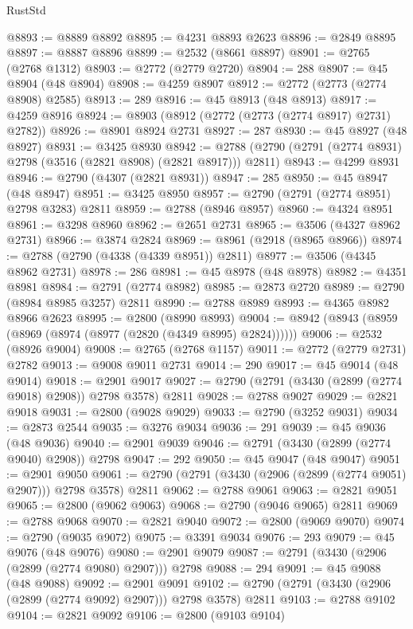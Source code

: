 \begin{lexlean}{RustStd}
\begin{coremodule}
@8893 := @8889 @8892
@8895 := @4231 @8893 @2623
@8896 := @2849 @8895
@8897 := @8887 @8896
@8899 := @2532 (@8661 @8897)
@8901 := @2765 (@2768 @1312)
@8903 := @2772 (@2779 @2720)
@8904 := 288
@8907 := @45 @8904 (@48 @8904)
@8908 := @4259 @8907
@8912 := @2772 (@2773 (@2774 @8908) @2585)
@8913 := 289
@8916 := @45 @8913 (@48 @8913)
@8917 := @4259 @8916
@8924 := @8903 (@8912 (@2772 (@2773 (@2774 @8917) @2731) @2782))
@8926 := @8901 @8924 @2731
@8927 := 287
@8930 := @45 @8927 (@48 @8927)
@8931 := @3425 @8930
@8942 := @2788 (@2790 (@2791 (@2774 @8931) @2798 (@3516 (@2821 @8908) (@2821 @8917))) @2811)
@8943 := @4299 @8931
@8946 := @2790 (@4307 (@2821 @8931))
@8947 := 285
@8950 := @45 @8947 (@48 @8947)
@8951 := @3425 @8950
@8957 := @2790 (@2791 (@2774 @8951) @2798 @3283) @2811
@8959 := @2788 (@8946 @8957)
@8960 := @4324 @8951
@8961 := @3298 @8960
@8962 := @2651 @2731
@8965 := @3506 (@4327 @8962 @2731)
@8966 := @3874 @2824
@8969 := @8961 (@2918 (@8965 @8966))
@8974 := @2788 (@2790 (@4338 (@4339 @8951)) @2811)
@8977 := @3506 (@4345 @8962 @2731)
@8978 := 286
@8981 := @45 @8978 (@48 @8978)
@8982 := @4351 @8981
@8984 := @2791 (@2774 @8982)
@8985 := @2873 @2720
@8989 := @2790 (@8984 @8985 @3257) @2811
@8990 := @2788 @8989
@8993 := @4365 @8982 @8966 @2623
@8995 := @2800 (@8990 @8993)
@9004 := @8942 (@8943 (@8959 (@8969 (@8974 (@8977 (@2820 (@4349 @8995) @2824))))))
@9006 := @2532 (@8926 @9004)
@9008 := @2765 (@2768 @1157)
@9011 := @2772 (@2779 @2731) @2782
@9013 := @9008 @9011 @2731
@9014 := 290
@9017 := @45 @9014 (@48 @9014)
@9018 := @2901 @9017
@9027 := @2790 (@2791 (@3430 (@2899 (@2774 @9018) @2908)) @2798 @3578) @2811
@9028 := @2788 @9027
@9029 := @2821 @9018
@9031 := @2800 (@9028 @9029)
@9033 := @2790 (@3252 @9031)
@9034 := @2873 @2544
@9035 := @3276 @9034
@9036 := 291
@9039 := @45 @9036 (@48 @9036)
@9040 := @2901 @9039
@9046 := @2791 (@3430 (@2899 (@2774 @9040) @2908)) @2798
@9047 := 292
@9050 := @45 @9047 (@48 @9047)
@9051 := @2901 @9050
@9061 := @2790 (@2791 (@3430 (@2906 (@2899 (@2774 @9051) @2907))) @2798 @3578) @2811
@9062 := @2788 @9061
@9063 := @2821 @9051
@9065 := @2800 (@9062 @9063)
@9068 := @2790 (@9046 @9065) @2811
@9069 := @2788 @9068
@9070 := @2821 @9040
@9072 := @2800 (@9069 @9070)
@9074 := @2790 (@9035 @9072)
@9075 := @3391 @9034
@9076 := 293
@9079 := @45 @9076 (@48 @9076)
@9080 := @2901 @9079
@9087 := @2791 (@3430 (@2906 (@2899 (@2774 @9080) @2907))) @2798
@9088 := 294
@9091 := @45 @9088 (@48 @9088)
@9092 := @2901 @9091
@9102 := @2790 (@2791 (@3430 (@2906 (@2899 (@2774 @9092) @2907))) @2798 @3578) @2811
@9103 := @2788 @9102
@9104 := @2821 @9092
@9106 := @2800 (@9103 @9104)

\end{coremodule}
\end{lexlean}
